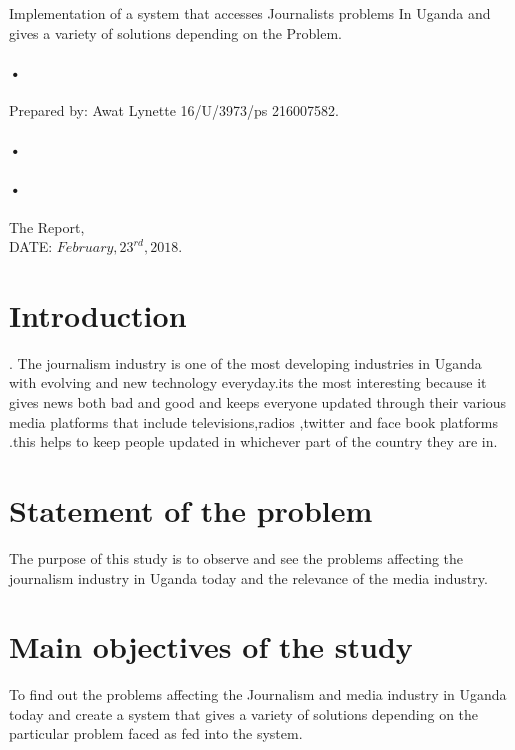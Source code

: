 \documentclass[12pt,]{article}
\begin{document}
\begin{titlepage}
\centerline{Implementation of a system that accesses Journalists problems In Uganda and gives a variety of solutions depending on the Problem.\\}
\paragraph*{•}
\centerline{  Prepared by:  Awat Lynette 16/U/3973/ps 216007582.\\}
\paragraph*{•}
\paragraph*{•}
  \begin{flushright}
  The Report,\\
  DATE: $February,23^{rd},2018$.
 \tableofcontents

  \end{flushright}
\date{\today}
\end{titlepage}

\newpage


\section{Introduction}.
The journalism industry is one of the most developing industries in Uganda with evolving and new technology everyday.its the most interesting because it gives news both bad and good and keeps everyone updated through their various media platforms that include televisions,radios ,twitter and face book platforms .this helps to keep people updated in whichever part of the country they are in.

\section{Statement of the problem}
The purpose of this study is to observe and see the problems affecting the journalism industry in Uganda today and the relevance of the media industry.

\section{Main objectives of the study}
To find out the problems affecting the Journalism and media industry in Uganda today and create a system that gives a variety of solutions depending on the particular problem faced as fed into the system.
\end{document}

